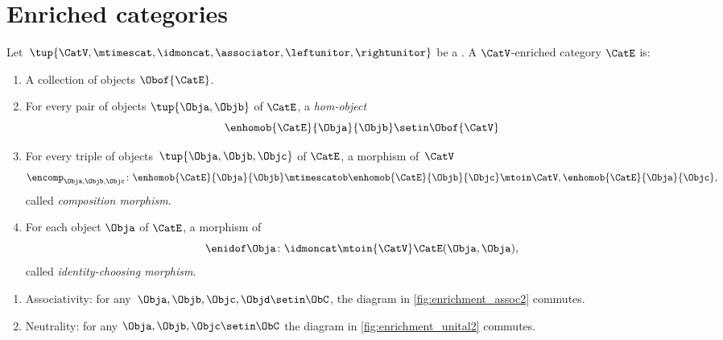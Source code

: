 
\section{Enriched categories}
\label{sec:enrichment-enriched-categories}

\begin{ctdefinition}
    \label{def:enriched_cat}
    Let~$\tup{\CatV, \mtimescat, \idmoncat, \associator, \leftunitor, \rightunitor}$ be a .
    A $\CatV$-enriched category $\CatE$ is:

    \constit
    \begin{enumerate}
        \item A collection of objects $\Obof{\CatE}$.
        \item For every pair of objects $\tup{\Obja, \Objb}$ of $\CatE$, a \emph{hom-object}
              \begin{equation}
                  \enhomob{\CatE}{\Obja}{\Objb} \setin \Obof{\CatV}
              \end{equation}
        \item For every triple of objects~$\tup{\Obja, \Objb, \Objc}$ of $\CatE$, a morphism of~$\CatV$
              \begin{equation}
                  \encomp_{\Obja,\Objb,\Objc}\colon \enhomob{\CatE}{\Obja}{\Objb} \mtimescatob \enhomob{\CatE}{\Objb}{\Objc} \mtoin\CatV, \enhomob{\CatE}{\Obja}{\Objc},
              \end{equation}
              called \emph{composition morphism}.
        \item For each object $\Obja$ of $\CatE$, a morphism of~\CatV
              \begin{equation}
                  \enidof\Obja \colon \idmoncat \mtoin{\CatV} \CatE(\Obja,\Obja),
              \end{equation}
              called \emph{identity-choosing morphism}.
    \end{enumerate}

    \condit
    \begin{enumerate}
        \item Associativity: for any~$\Obja,\Objb,\Objc,\Objd\setin \ObC$, the diagram in \cref{fig:enrichment_assoc2} commutes.
        \item Neutrality: for any $\Obja,\Objb,\Objc \setin \ObC$ the diagram in \cref{fig:enrichment_unital2} commutes.
    \end{enumerate}
\end{ctdefinition}

